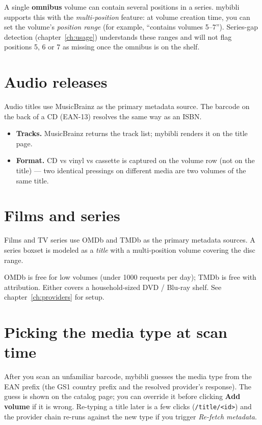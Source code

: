 A single \textbf{omnibus} volume can contain several
positions in a series. mybibli supports this with the
\emph{multi-position} feature: at volume
creation time, you can set the volume's \emph{position range} (for
example, ``contains volumes 5--7''). Series-gap detection
(chapter~\ref{ch:usage}) understands these ranges and will not flag
positions 5, 6 or 7 as missing once the omnibus is on the shelf.

\section{Audio releases}

Audio titles use MusicBrainz as the primary
metadata source. The barcode on the back of a CD (EAN-13) resolves
the same way as an ISBN.

\begin{itemize}
  \item \textbf{Tracks.} MusicBrainz returns the track list; mybibli
        renders it on the title page.
  \item \textbf{Format.} CD vs vinyl vs cassette is captured on the
        volume row (not on the title) — two identical pressings on
        different media are two volumes of the same title.
\end{itemize}

\section{Films and series}

Films and TV series use OMDb and TMDb as the
primary metadata sources. A series boxset is modeled as a
\emph{title} with a multi-position volume covering the disc range.

\begin{tip}
OMDb is free for low volumes (under 1000 requests per day); TMDb is
free with attribution. Either covers a household-sized
DVD / Blu-ray shelf. See chapter~\ref{ch:providers} for setup.
\end{tip}

\section{Picking the media type at scan time}

After you scan an unfamiliar barcode, mybibli guesses the media
type from the EAN prefix (the GS1 country prefix and the resolved
provider's response). The guess is shown on the catalog page; you
can override it before clicking \textbf{Add volume} if it is
wrong. Re-typing a title later is a few clicks
(\texttt{/title/<id>}) and the provider chain re-runs against the
new type if you trigger \emph{Re-fetch metadata}.
